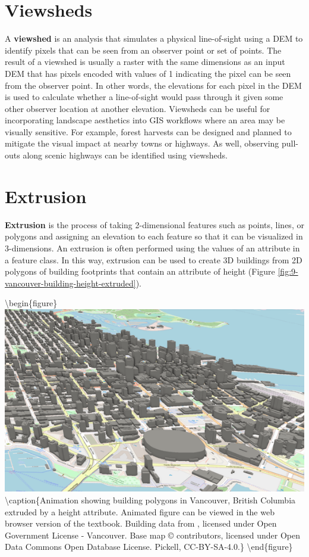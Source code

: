 \documentclass[
]{book}
\begin{document}
\hypertarget{viewsheds}{%
\section{Viewsheds}\label{viewsheds}}

A \textbf{viewshed} is an analysis that simulates a physical line-of-sight using a DEM to identify pixels that can be seen from an observer point or set of points. The result of a viewshed is usually a raster with the same dimensions as an input DEM that has pixels encoded with values of 1 indicating the pixel can be seen from the observer point. In other words, the elevations for each pixel in the DEM is used to calculate whether a line-of-sight would pass through it given some other observer location at another elevation. Viewsheds can be useful for incorporating landscape aesthetics into GIS workflows where an area may be visually sensitive. For example, forest harvests can be designed and planned to mitigate the visual impact at nearby towns or highways. As well, observing pull-outs along scenic highways can be identified using viewsheds.

\hypertarget{extrusion}{%
\section{Extrusion}\label{extrusion}}

\textbf{Extrusion} is the process of taking 2-dimensional features such as points, lines, or polygons and assigning an elevation to each feature so that it can be visualized in 3-dimensions. An extrusion is often performed using the values of an attribute in a feature class. In this way, extrusion can be used to create 3D buildings from 2D polygons of building footprints that contain an attribute of height (Figure \ref{fig:9-vancouver-building-height-extruded}).

\textbackslash begin\{figure\}
\includegraphics[width=0.75\linewidth]{images/09-vancouver-building-height-extruded} \textbackslash caption\{Animation showing building polygons in Vancouver, British Columbia extruded by a height attribute. Animated figure can be viewed in the web browser version of the textbook. Building data from \citet{city_of_vancouver_notitle_2009}, licensed under Open Government License - Vancouver. Base map © \citet{openstreetmap_notitle_nodate} contributors, licensed under Open Data Commons Open Database License. Pickell, CC-BY-SA-4.0.\}\label{fig:9-vancouver-building-height-extruded}
\textbackslash end\{figure\}
\end{document}
